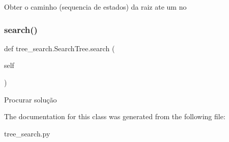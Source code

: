 \begin{DoxyVerb}Obter o caminho (sequencia de estados) da raiz ate um no\end{DoxyVerb}
 \mbox{\label{classtree__search_1_1_search_tree_ac37d7c8abc0ab14a304ff0272b2094af}} 
\subsubsection{\texorpdfstring{search()}{search()}}
{\footnotesize\ttfamily def tree\+\_\+search.\+Search\+Tree.\+search (\begin{DoxyParamCaption}\item[{}]{self }\end{DoxyParamCaption})}

\begin{DoxyVerb}Procurar solução\end{DoxyVerb}
 

The documentation for this class was generated from the following file\+:\begin{DoxyCompactItemize}
\item 
tree\+\_\+search.\+py\end{DoxyCompactItemize}
